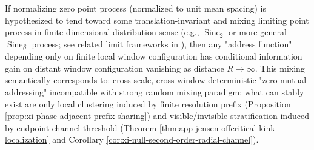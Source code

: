 \begin{remark}\label{rem:xi-phase-mixing-no-addressing}
If normalizing zero point process (normalized to unit mean spacing) is hypothesized to tend toward some translation-invariant and mixing limiting point process in finite-dimensional distribution sense (e.g., \(\operatorname{Sine}_2\) or more general \(\operatorname{Sine}_\beta\) process; see related limit frameworks in \cite{AriasDeReynaRodgers2024ConvergencePointsZetaZeros,ChhaibiNajnudel2018RigiditySineBeta}), then any "address function" depending only on finite local window configuration has conditional information gain on distant window configuration vanishing as distance \(R\to\infty\).
This mixing semantically corresponds to: cross-scale, cross-window deterministic "zero mutual addressing" incompatible with strong random mixing paradigm; what can stably exist are only local clustering induced by finite resolution prefix (Proposition \ref{prop:xi-phase-adjacent-prefix-sharing}) and visible/invisible stratification induced by endpoint channel threshold (Theorem \ref{thm:app-jensen-offcritical-kink-localization} and Corollary \ref{cor:xi-null-second-order-radial-channel}).
\end{remark}

\endinput
